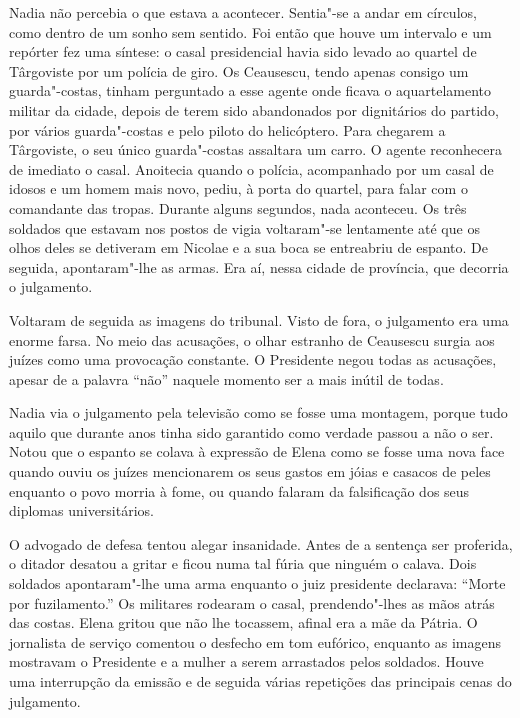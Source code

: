 Nadia não percebia o que estava a acontecer. Sentia"-se
a andar em círculos, como dentro de um sonho sem sentido. Foi então que houve um intervalo e um repórter fez uma síntese: o
casal presidencial havia sido levado ao quartel de Târgoviste por um
polícia de giro. Os Ceausescu, tendo apenas consigo um guarda"-costas,
tinham perguntado a esse agente onde ficava o aquartelamento militar da
cidade, depois de terem sido abandonados por dignitários do partido, por
vários guarda"-costas e pelo piloto do helicóptero. Para chegarem a
Târgoviste, o seu único guarda"-costas assaltara um carro. O agente
reconhecera de imediato o casal. Anoitecia quando o polícia,
acompanhado por um casal de idosos e um homem mais novo, pediu, à porta
do quartel, para falar com o comandante das tropas. Durante alguns
segundos, nada aconteceu. Os três soldados que estavam nos postos de
vigia voltaram"-se lentamente até que os olhos deles se detiveram em
Nicolae e a sua boca se entreabriu de espanto. De seguida, apontaram"-lhe
as armas. Era aí, nessa cidade de província, que decorria o julgamento.

Voltaram de seguida as imagens do tribunal. Visto de
fora, o julgamento era uma enorme farsa. No meio das acusações, o olhar
estranho de Ceausescu surgia aos juízes como uma provocação constante. O
Presidente negou todas as acusações, apesar de a palavra ``não'' naquele
momento ser a mais inútil de todas.

Nadia via o julgamento pela televisão como se fosse uma montagem, porque
tudo aquilo que durante anos tinha sido garantido como verdade passou a
não o ser. Notou que o espanto se colava à expressão de Elena como se
fosse uma nova face quando ouviu os juízes mencionarem os seus gastos
em jóias e casacos de peles enquanto o
povo morria à fome, ou quando falaram da falsificação dos seus diplomas
universitários.

O advogado de defesa tentou alegar insanidade. Antes de a sentença ser
proferida, o ditador desatou a gritar e ficou numa tal fúria que ninguém
o calava. Dois soldados apontaram"-lhe uma arma enquanto o juiz
presidente declarava: ``Morte por fuzilamento.'' Os militares rodearam o
casal, prendendo"-lhes as mãos atrás das costas. Elena gritou que não lhe
tocassem, afinal era a mãe da Pátria. O jornalista de serviço comentou o
desfecho em tom eufórico, enquanto as imagens mostravam o Presidente e
a mulher a serem arrastados pelos soldados. Houve uma interrupção da
emissão e de seguida várias repetições das principais cenas do
julgamento.

